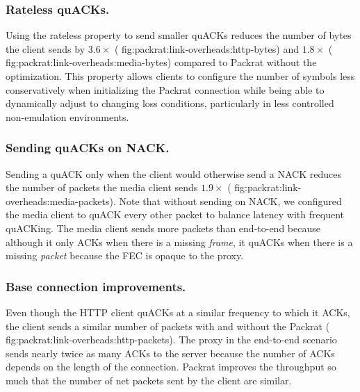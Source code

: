 \subsubsection{Rateless quACKs.}
Using the rateless property to send smaller quACKs
reduces the number of bytes the client sends by $3.6\!\times$ (\Cref
{fig:packrat:link-overheads:http-bytes}) and $1.8\!\times$ (\Cref
{fig:packrat:link-overheads:media-bytes}) compared to Packrat without the optimization.
This property allows clients to configure the number of symbols less
conservatively when initializing the Packrat connection while being able to
dynamically adjust to changing loss conditions, particularly in less controlled
non-emulation environments.

\subsubsection{Sending quACKs on NACK.}

Sending a quACK only when the client would otherwise send a NACK reduces the
number of packets the media client sends $1.9\!\times$ (\Cref
{fig:packrat:link-overheads:media-packets}). Note that without sending on NACK, we
configured the media client to quACK every other packet to balance latency with
frequent quACKing. The media client sends more packets than end-to-end because
although it only ACKs when there is a missing \textit{frame}, it quACKs when
there is a missing \textit{packet} because the FEC is opaque to the proxy.

\subsubsection{Base connection improvements.}

Even though the HTTP client quACKs at a similar frequency to which it ACKs, the
client sends a similar number of packets with and without the Packrat (\Cref
{fig:packrat:link-overheads:http-packets}). The proxy in the end-to-end scenario sends
nearly twice as many ACKs to the server because the number of ACKs depends on
the length of the connection. Packrat improves the throughput so much that the
number of net packets sent by the client are similar.

